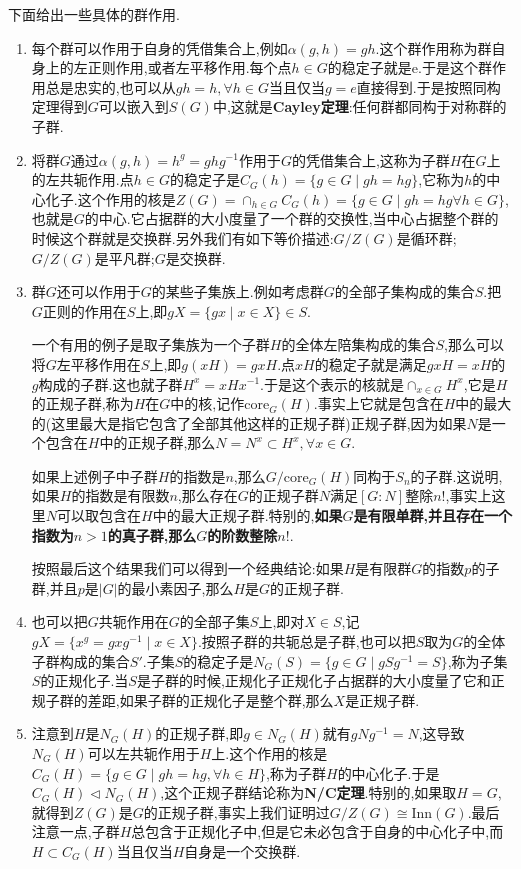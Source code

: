 下面给出一些具体的群作用.
\begin{enumerate}
	\item 每个群可以作用于自身的凭借集合上,例如$\alpha(g,h)=gh$.这个群作用称为群自身上的左正则作用,或者左平移作用.每个点$h\in G$的稳定子就是{e}.于是这个群作用总是忠实的,也可以从$gh=h,\forall h\in G$当且仅当$g=e$直接得到.于是按照同构定理得到$G$可以嵌入到$S(G)$中,这就是\textbf{Cayley定理}:任何群都同构于对称群的子群.
	\item 将群$G$通过$\alpha(g,h)=h^g=ghg^{-1}$作用于$G$的凭借集合上,这称为子群$H$在$G$上的左共轭作用.点$h\in G$的稳定子是$C_G(h)=\{g\in G\mid gh=hg\}$,它称为$h$的中心化子.这个作用的核是$Z(G)=\cap_{h\in G}C_G(h)=\{g\in G\mid gh=hg\forall h\in G\}$,也就是$G$的中心.它占据群的大小度量了一个群的交换性,当中心占据整个群的时候这个群就是交换群.另外我们有如下等价描述:$G/Z(G)$是循环群;$G/Z(G)$是平凡群;$G$是交换群.
	\item 群$G$还可以作用于$G$的某些子集族上.例如考虑群$G$的全部子集构成的集合$S$.把$G$正则的作用在$S$上,即$gX=\{gx\mid x\in X\}\in S$.
	
	一个有用的例子是取子集族为一个子群$H$的全体左陪集构成的集合$S$,那么可以将$G$左平移作用在$S$上,即$g(xH)=gxH$.点$xH$的稳定子就是满足$gxH=xH$的$g$构成的子群.这也就子群$H^x=xHx^{-1}$.于是这个表示的核就是$\cap_{x\in G}H^x$,它是$H$的正规子群,称为$H$在$G$中的核,记作$\mathrm{core}_G(H)$.事实上它就是包含在$H$中的最大的(这里最大是指它包含了全部其他这样的正规子群)正规子群,因为如果$N$是一个包含在$H$中的正规子群,那么$N=N^x\subset H^x,\forall x\in G$.
	
	如果上述例子中子群$H$的指数是$n$,那么$G/\mathrm{core}_G(H)$同构于$S_n$的子群.这说明,如果$H$的指数是有限数$n$,那么存在$G$的正规子群$N$满足$[G:N]$整除$n!$,事实上这里$N$可以取包含在$H$中的最大正规子群.特别的,\textbf{如果$G$是有限单群,并且存在一个指数为$n>1$的真子群,那么$G$的阶数整除$n!$}.
	
	按照最后这个结果我们可以得到一个经典结论:如果$H$是有限群$G$的指数$p$的子群,并且$p$是$|G|$的最小素因子,那么$H$是$G$的正规子群.
	\item 也可以把$G$共轭作用在$G$的全部子集$S$上,即对$X\in S$,记$gX=\{x^g=gxg^{-1}\mid x\in X\}$.按照子群的共轭总是子群,也可以把$S$取为$G$的全体子群构成的集合$S'$.子集$S$的稳定子是$N_G(S)=\{g\in G\mid gSg^{-1}=S\}$,称为子集$S$的正规化子.当$S$是子群的时候,正规化子正规化子占据群的大小度量了它和正规子群的差距,如果子群的正规化子是整个群,那么$X$是正规子群.
	\item 注意到$H$是$N_G(H)$的正规子群,即$g\in N_G(H)$就有$gNg^{-1}=N$,这导致$N_G(H)$可以左共轭作用于$H$上.这个作用的核是$C_G(H)=\{g\in G\mid gh=hg,\forall h\in H\}$,称为子群$H$的中心化子.于是$C_G(H)\triangleleft N_G(H)$,这个正规子群结论称为\textbf{N/C定理}.特别的,如果取$H=G$,就得到$Z(G)$是$G$的正规子群,事实上我们证明过$G/Z(G)\cong\mathrm{Inn}(G)$.最后注意一点,子群$H$总包含于正规化子中,但是它未必包含于自身的中心化子中,而$H\subset C_G(H)$当且仅当$H$自身是一个交换群.
\end{enumerate}

